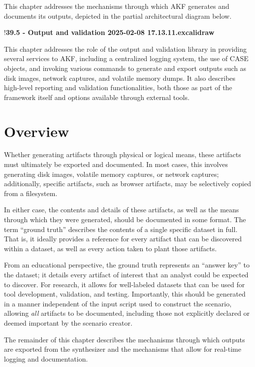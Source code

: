 This chapter addresses the mechanisms through which AKF generates and
documents its outputs, depicted in the partial architectural diagram
below.

!\textbf{39.5 - Output and validation 2025-02-08 17.13.11.excalidraw}

This chapter addresses the role of the output and validation library in
providing several services to AKF, including a centralized logging
system, the use of CASE objects, and invoking various commands to
generate and export outputs such as disk images, network captures, and
volatile memory dumps. It also describes high-level reporting and
validation functionalities, both those as part of the framework itself
and options available through external tools.

\section{Overview}\label{overview}

Whether generating artifacts through physical or logical means, these
artifacts must ultimately be exported and documented. In most cases,
this involves generating disk images, volatile memory captures, or
network captures; additionally, specific artifacts, such as browser
artifacts, may be selectively copied from a filesystem.

In either case, the contents and details of these artifacts, as well as
the means through which they were generated, should be documented in
some format. The term ``ground truth'' describes the contents of a
single specific dataset in full. That is, it ideally provides a
reference for every artifact that can be discovered within a dataset, as
well as every action taken to plant those artifacts.

From an educational perspective, the ground truth represents an ``answer
key'' to the dataset; it details every artifact of interest that an
analyst could be expected to discover. For research, it allows for
well-labeled datasets that can be used for tool development, validation,
and testing. Importantly, this should be generated in a manner
independent of the input script used to construct the scenario, allowing
\emph{all} artifacts to be documented, including those not explicitly
declared or deemed important by the scenario creator.

The remainder of this chapter describes the mechanisms through which
outputs are exported from the synthesizer and the mechanisms that allow
for real-time logging and documentation.

